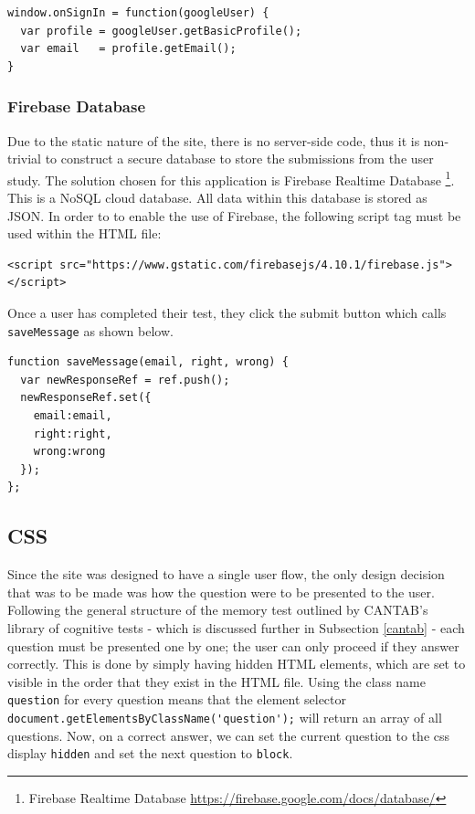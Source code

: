 \documentclass[ %
                    author={Elis Jones},
                supervisor={Dr. Kirsten Cater},
                    degree={BSc},
                     title={The Effect of Presentation Medium on Spatial Cognition},
                  subtitle={in the Virtual Environment},
                      year={2018} ]{dissertation}
\begin{document}
\bigskip
\noindent \begin{minipage}{\textwidth}
\centering
\begin{lstlisting}
window.onSignIn = function(googleUser) {
  var profile = googleUser.getBasicProfile();
  var email   = profile.getEmail();
}
\end{lstlisting}
\end{minipage}


\subsubsection{Firebase Database}
Due to the static nature of the site, there is no server-side code, thus it is non-trivial to construct a secure database to store the submissions from the user study. The solution chosen for this application is Firebase Realtime Database \footnote{Firebase Realtime Database \url{https://firebase.google.com/docs/database/}}. This is a NoSQL cloud database. All data within this database is stored as JSON. In order to to enable the use of Firebase, the following script tag must be used within the HTML file:

\noindent \begin{minipage}{\textwidth}
\centering
\begin{lstlisting}
<script src="https://www.gstatic.com/firebasejs/4.10.1/firebase.js"></script>
\end{lstlisting}
\end{minipage}

Once a user has completed their test, they click the submit button which calls \lstinline{saveMessage} as shown below.

\bigskip
\noindent \begin{minipage}{\textwidth}
\centering
\begin{lstlisting}
function saveMessage(email, right, wrong) {
  var newResponseRef = ref.push();
  newResponseRef.set({
    email:email,
    right:right,
    wrong:wrong
  });
};
\end{lstlisting}
\end{minipage}

\subsection{CSS}
Since the site was designed to have a single user flow, the only design decision that was to be made was how the question were to be presented to the user. Following the general structure of the memory test outlined by CANTAB's library of cognitive tests - which is discussed further in Subsection \ref{cantab} - each question must be presented one by one; the user can only proceed if they answer correctly. This is done by simply having hidden HTML elements, which are set to visible in the order that they exist in the HTML file. Using the class name \lstinline{question} for every question means that the element selector \lstinline{document.getElementsByClassName('question');} will return an array of all questions. Now, on a correct answer, we can set the current question to the css display \lstinline{hidden} and set the next question to \lstinline{block}.
\end{document}
